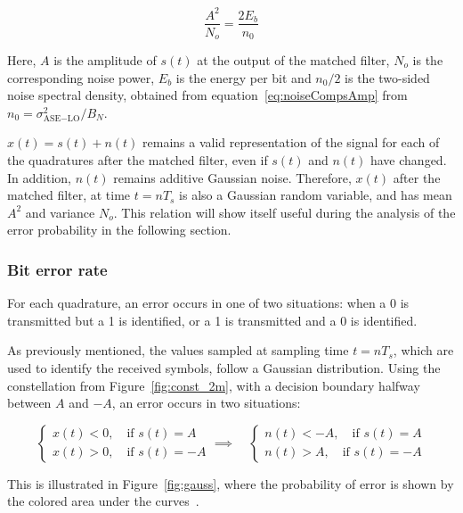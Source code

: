 	\begin{equation}\label{eq:amp2en}
		\frac{A^2}{N_o} = \frac{2 E_b}{n_0}
	\end{equation}

	Here, $A$ is the amplitude of $s(t)$ at the output of the matched filter,
	$N_o$ is the corresponding noise power, $E_b$ is the energy per bit and $n_0/2$
	is the two-sided noise spectral density, obtained from
	equation~\ref{eq:noiseCompsAmp} from
	$n_0 = \sigma_{\text{ASE}-\text{LO}}^2 / B_N$.


	$x(t) = s(t) + n(t)$ remains a valid representation of the signal for each of
	the quadratures after the matched filter, even if $s(t)$ and $n(t)$ have
	changed. In addition, $n(t)$ remains additive Gaussian noise. Therefore,
	$x(t)$ after the matched filter, at time $t = nT_s$ is also a Gaussian random
	variable, and has mean $A^2$ and variance $N_o$. This relation will show
	itself useful during the analysis of the error probability in the following
	section.


	\subsubsection{Bit error rate}
	For each quadrature, an error occurs in one of two situations: when a 0 is
	transmitted but a 1 is identified, or a 1 is transmitted and a 0 is
	identified.

	As previously mentioned, the values sampled at sampling time $t = nT_s$, which are used to
	identify the received symbols, follow a Gaussian
	distribution. Using the constellation from
	Figure~\ref{fig:const_2m}, with a decision boundary halfway between $A$ and
	$-A$, an error occurs in two situations:

	\begin{equation}
		\begin{cases}
			x(t) < 0, \quad \text{if } s(t)=A \\
			x(t) > 0, \quad \text{if } s(t)=-A
		\end{cases}
		\implies \quad
		\begin{cases}
			n(t) < -A, \quad \text{if } s(t)=A \\
			n(t) > A, \quad \text{if } s(t)=-A
		\end{cases}
	\end{equation}

	This is illustrated in Figure~\ref{fig:gauss},
	where the probability of error is shown by the colored area under the
	curves~\cite{schwartz90}.

